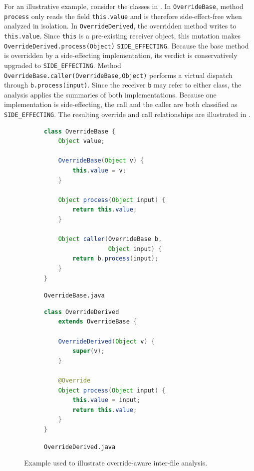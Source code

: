 \documentclass{article}
\begin{document}
For an illustrative example, consider the classes in . In \texttt{OverrideBase}, method \texttt{process} only reads the field \texttt{this.value} and is therefore side-effect-free when analyzed in isolation. In \texttt{OverrideDerived}, the overridden method writes to \texttt{this.value}. Since \texttt{this} is a pre-existing receiver object, this mutation makes \texttt{OverrideDerived.process(Object)} \texttt{SIDE\_EFFECTING}. Because the base method is overridden by a side-effecting implementation, its verdict is conservatively upgraded to \texttt{SIDE\_EFFECTING}. Method \texttt{OverrideBase.caller(OverrideBase,Object)} performs a virtual dispatch through \texttt{b.process(input)}. Since the receiver \texttt{b} may refer to either class, the analysis applies the summaries of both implementations. Because one implementation is side-effecting, the call and the caller are both classified as \texttt{SIDE\_EFFECTING}. The resulting override and call relationships are illustrated in .

\begin{figure}[H]
\centering
\begin{subfigure}[t]{0.48\textwidth}
\begin{lstlisting}[language=Java]
class OverrideBase {
    Object value;

    OverrideBase(Object v) {
        this.value = v;
    }

    Object process(Object input) {
        return this.value;
    }

    Object caller(OverrideBase b,
                  Object input) {
        return b.process(input);
    }
}
\end{lstlisting}
\caption{\texttt{OverrideBase.java}}
\end{subfigure}
\hfill
\begin{subfigure}[t]{0.48\textwidth}
\begin{lstlisting}[language=Java]
class OverrideDerived
    extends OverrideBase {

    OverrideDerived(Object v) {
        super(v);
    }

    @Override
    Object process(Object input) {
        this.value = input;
        return this.value;
    }
}
\end{lstlisting}
\caption{\texttt{OverrideDerived.java}}
\end{subfigure}
\caption{Example used to illustrate override-aware inter-file analysis.}
\label{fig:override-example-code}
\end{figure}
\end{document}
